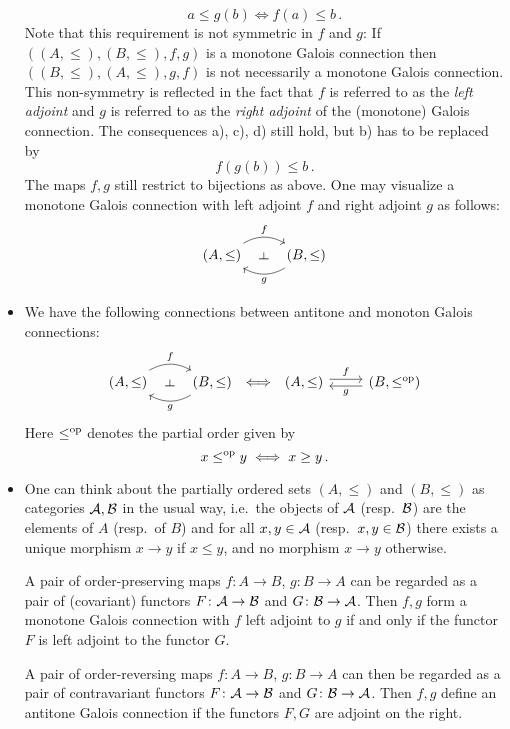 \begin{remark}
\begin{itemize}
      \[
              a \leq g(b)
        \iff  f(a) \leq b \,.
      \]
      Note that this requirement is not symmetric in $f$ and $g$:
      If $((A, \leq), (B, \leq), f, g)$ is a monotone Galois connection then $((B, \leq), (A, \leq), g, f)$ is not necessarily a monotone Galois connection.
      This non-symmetry is reflected in the fact that $f$ is referred to as the \emph{left adjoint} and $g$ is referred to as the \emph{right adjoint} of the (monotone) Galois connection.
      The consequences a), c), d) still hold, but b) has to be replaced by
      \[
        f(g(b)) \leq b \,.
      \]
      The maps $f, g$ still restrict to bijections as above.
      One may visualize a monotone Galois connection with left adjoint $f$ and right adjoint $g$ as follows:
      \[
        \begin{tikzcd}
            (A,\leq)
            \arrow[bend left]{r}[above]{f}
            \arrow[phantom]{r}[rotate=90]{\vdash}
          & (B,\leq)
            \arrow[bend left]{l}[below]{g}
        \end{tikzcd}
      \]
    \item
      We have the following connections between antitone and monoton Galois connections:
      \[
          \begin{tikzcd}
              (A,\leq)
              \arrow[bend left]{r}[above]{f}
              \arrow[phantom]{r}[rotate=90]{\vdash}
            & (B,\leq)
              \arrow[bend left]{l}[below]{g}
          \end{tikzcd}
          \iff
          \begin{tikzcd}
              (A,\leq)
              \arrow[shift left]{r}[above]{f}
            & (B,\leq^{\op})
              \arrow[shift left]{l}[below]{g}
          \end{tikzcd}
      \]
      Here $\leq^{\mathrm{op}}$ denotes the partial order given by
      \[
              x \leq^{\mathrm{op}} y
        \iff  x \geq y \,.
      \]
    \item
      One can think about the partially ordered sets $(A, \leq)$ and $(B, \leq)$ as categories $\mathcal{A}, \mathcal{B}$ in the usual way, i.e.\ the objects of $\mathcal{A}$ (resp.\ $\mathcal{B}$) are the elements of $A$ (resp.\ of $B$) and for all $x, y \in \mathcal{A}$ (resp.\ $x, y \in \mathcal{B}$) there exists a unique morphism $x \to y$ if $x \leq y$, and no morphism $x \to y$ otherwise.
      
      A pair of order-preserving maps $f \colon A \to B$, $g \colon B \to A$ can be regarded as a pair of (covariant) functors $F \colon \mathcal{A} \to \mathcal{B}$ and $G \colon \mathcal{B} \to \mathcal{A}$.
      Then $f, g$ form a monotone Galois connection with $f$ left adjoint to $g$ if and only if the functor $F$ is left adjoint to the functor $G$.
      
      A pair of order-reversing maps $f \colon A \to B$, $g \colon B \to A$ can then be regarded as a pair of contravariant functors $F \colon \mathcal{A} \to \mathcal{B}$ and $G \colon \mathcal{B} \to \mathcal{A}$.
      Then $f, g$ define an antitone Galois connection if the functors $F, G$ are adjoint on the right.
  \end{itemize}
\end{remark}


